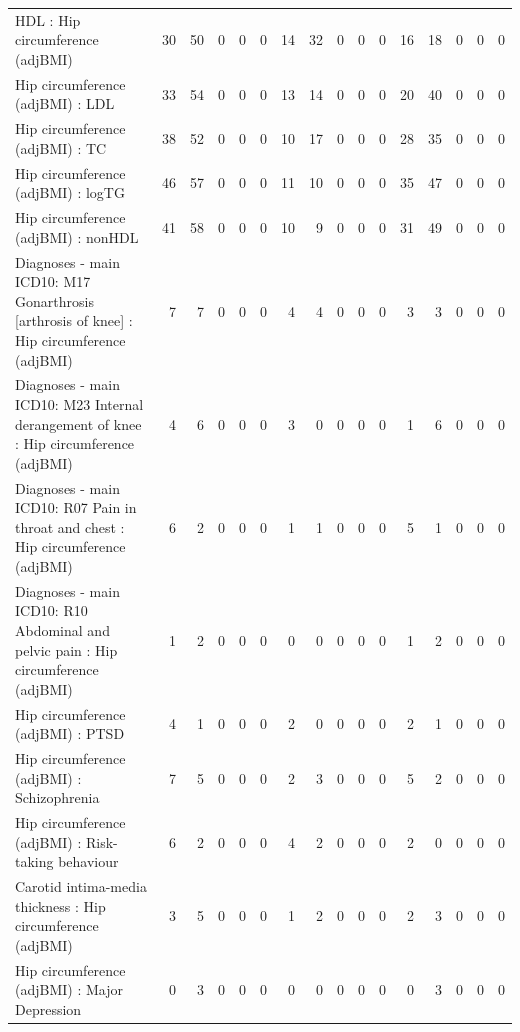 \begin{table}[ht]
\begin{tabular}{lrrrrrrrrrrrrrrr}
  HDL : Hip circumference (adjBMI) &  30 &  50 &   0 &   0 &   0 &  14 &  32 &   0 &   0 &   0 &  16 &  18 &   0 &   0 &   0 \\ 
  Hip circumference (adjBMI) : LDL &  33 &  54 &   0 &   0 &   0 &  13 &  14 &   0 &   0 &   0 &  20 &  40 &   0 &   0 &   0 \\ 
  Hip circumference (adjBMI) : TC &  38 &  52 &   0 &   0 &   0 &  10 &  17 &   0 &   0 &   0 &  28 &  35 &   0 &   0 &   0 \\ 
  Hip circumference (adjBMI) : logTG &  46 &  57 &   0 &   0 &   0 &  11 &  10 &   0 &   0 &   0 &  35 &  47 &   0 &   0 &   0 \\ 
  Hip circumference (adjBMI) : nonHDL &  41 &  58 &   0 &   0 &   0 &  10 &   9 &   0 &   0 &   0 &  31 &  49 &   0 &   0 &   0 \\ 
  Diagnoses - main ICD10: M17 Gonarthrosis [arthrosis of knee] : Hip circumference (adjBMI) &   7 &   7 &   0 &   0 &   0 &   4 &   4 &   0 &   0 &   0 &   3 &   3 &   0 &   0 &   0 \\ 
  Diagnoses - main ICD10: M23 Internal derangement of knee : Hip circumference (adjBMI) &   4 &   6 &   0 &   0 &   0 &   3 &   0 &   0 &   0 &   0 &   1 &   6 &   0 &   0 &   0 \\ 
  Diagnoses - main ICD10: R07 Pain in throat and chest : Hip circumference (adjBMI) &   6 &   2 &   0 &   0 &   0 &   1 &   1 &   0 &   0 &   0 &   5 &   1 &   0 &   0 &   0 \\ 
  Diagnoses - main ICD10: R10 Abdominal and pelvic pain : Hip circumference (adjBMI) &   1 &   2 &   0 &   0 &   0 &   0 &   0 &   0 &   0 &   0 &   1 &   2 &   0 &   0 &   0 \\ 
  Hip circumference (adjBMI) : PTSD &   4 &   1 &   0 &   0 &   0 &   2 &   0 &   0 &   0 &   0 &   2 &   1 &   0 &   0 &   0 \\ 
  Hip circumference (adjBMI) : Schizophrenia &   7 &   5 &   0 &   0 &   0 &   2 &   3 &   0 &   0 &   0 &   5 &   2 &   0 &   0 &   0 \\ 
  Hip circumference (adjBMI) : Risk-taking behaviour &   6 &   2 &   0 &   0 &   0 &   4 &   2 &   0 &   0 &   0 &   2 &   0 &   0 &   0 &   0 \\ 
  Carotid intima-media thickness : Hip circumference (adjBMI) &   3 &   5 &   0 &   0 &   0 &   1 &   2 &   0 &   0 &   0 &   2 &   3 &   0 &   0 &   0 \\ 
  Hip circumference (adjBMI) : Major Depression &   0 &   3 &   0 &   0 &   0 &   0 &   0 &   0 &   0 &   0 &   0 &   3 &   0 &   0 &   0 \\ 

\end{tabular}
\end{table}
